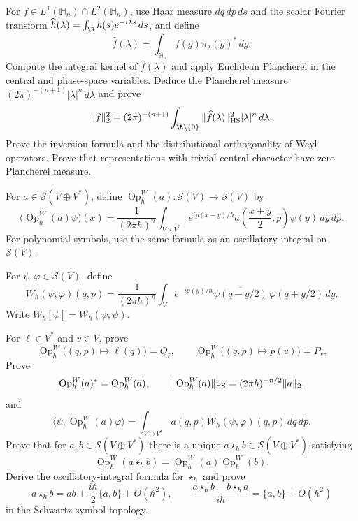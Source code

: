 \begin{exercise}
\label{ex:heisenberg-harmonic-analysis}
For $f\in L^1(\mathbb H_n)\cap L^2(\mathbb H_n)$, use Haar measure
$dq\,dp\,ds$ and the scalar Fourier transform
$\widehat h(\lambda)=\int_\R h(s)e^{-i\lambda s}\,ds$, and define
\[
\widehat f(\lambda)
=\int_{\mathbb H_n}f(g)\pi_\lambda(g)^*\,dg.
\]
Compute the integral kernel of $\widehat f(\lambda)$ and apply Euclidean
Plancherel in the central and phase-space variables.  Deduce the Plancherel measure
$(2\pi)^{-(n+1)}|\lambda|^n\,d\lambda$ and prove
\[
\|f\|_2^2
=(2\pi)^{-(n+1)}\int_{\R\setminus\{0\}}
\|\widehat f(\lambda)\|_{\rm HS}^2|\lambda|^n\,d\lambda.
\]
Prove the inversion formula and the distributional orthogonality of Weyl
operators.  Prove that representations with trivial central character have
zero Plancherel measure.
\end{exercise}

\begin{exercise}
For $a\in\mathcal S(V\oplus V^*)$, define
$\operatorname{Op}_\hbar^W(a):\mathcal S(V)\to\mathcal S(V)$ by
\[
\bigl(\operatorname{Op}_\hbar^W(a)\psi\bigr)(x)
=\frac{1}{(2\pi\hbar)^n}
\int_{V\times V^*}
e^{ip(x-y)/\hbar}
a\!\left(\frac{x+y}{2},p\right)\psi(y)\,dy\,dp.
\]
For polynomial symbols, use the same formula as an oscillatory integral on
$\mathcal S(V)$.

For $\psi,\varphi\in\mathcal S(V)$, define
\[
W_\hbar(\psi,\varphi)(q,p)
=\frac{1}{(2\pi\hbar)^n}
\int_Ve^{-ip(y)/\hbar}
\overline{\psi(q-y/2)}\,\varphi(q+y/2)\,dy.
\]
Write $W_\hbar[\psi]=W_\hbar(\psi,\psi)$.

For $\ell\in V^*$ and $v\in V$, prove
\[
\operatorname{Op}_\hbar^W\bigl((q,p)\mapsto\ell(q)\bigr)=Q_\ell,
\qquad
\operatorname{Op}_\hbar^W\bigl((q,p)\mapsto p(v)\bigr)=P_v.
\]
Prove
\[
\operatorname{Op}_\hbar^W(a)^*
=\operatorname{Op}_\hbar^W(\overline a),
\qquad
\|\operatorname{Op}_\hbar^W(a)\|_{\rm HS}
=(2\pi\hbar)^{-n/2}\|a\|_2,
\]
and
\[
\langle\psi,\operatorname{Op}_\hbar^W(a)\varphi\rangle
=\int_{V\oplus V^*}a(q,p)W_\hbar(\psi,\varphi)(q,p)\,dq\,dp.
\]
Prove that for $a,b\in\mathcal S(V\oplus V^*)$ there is a unique
$a\star_\hbar b\in\mathcal S(V\oplus V^*)$ satisfying
\[
\operatorname{Op}_\hbar^W(a\star_\hbar b)
=\operatorname{Op}_\hbar^W(a)\operatorname{Op}_\hbar^W(b).
\]
Derive the oscillatory-integral formula for $\star_\hbar$ and prove
\[
a\star_\hbar b
=ab+\frac{i\hbar}{2}\{a,b\}+O(\hbar^2),
\qquad
\frac{a\star_\hbar b-b\star_\hbar a}{i\hbar}
=\{a,b\}+O(\hbar^2)
\]
in the Schwartz-symbol topology.
\end{exercise}

